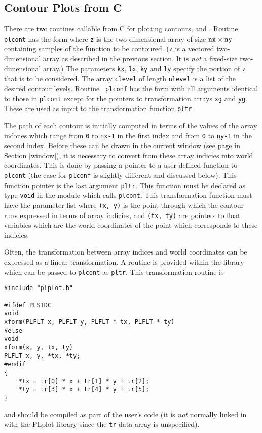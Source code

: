 
\subsection {Contour Plots from C}

There are two routines callable from C for plotting contours, 
and .  Routine {\tt plcont} has the form 
where {\tt z} is the two-dimensional
array of size ${\tt nx}\times{\tt ny}$ containing samples of the function to
be contoured.  ({\tt z} is a vectored two-dimensional array as described in
the previous section.  It is {\em not\/} a fixed-size two-dimensional
array.) The parameters {\tt kx}, {\tt lx}, {\tt ky} and {\tt ly} specify the
portion of {\tt z} that is to be considered.  The array {\tt clevel} of
length {\tt nlevel} is a list of the desired contour levels.  Routine {\tt
plconf} has the form  with all arguments identical to those in {\tt plcont} except
for the pointers to transformation arrays {\tt xg} and {\tt yg}.  These are
used as input to the transformation function {\tt pltr}.

The path of each contour is initially computed in terms of the values of the
array indicies which range from {\tt 0} to {\tt nx-1} in the
first index and from
{\tt 0} to {\tt ny-1} in the second index.
Before these can be drawn in the current
window (see page \pageref{window} in Section \ref{window}), it is
necessary to
convert from these array indicies into world coordinates. This is done by
passing a pointer to a user-defined function to {\tt plcont} (the case for
{\tt plconf} is slightly different and discussed below).  This
function pointer is the last argument {\tt pltr}.
This function must be declared as type {\tt void} in the
module which calls {\tt plcont}. This transformation function
must have the parameter list
where {\tt (x, y)}
is the point through which the contour runs expressed in terms of array
indicies, and {\tt (tx, ty)} are pointers to float variables which are the
world coordinates of the point which corresponds to these indicies.

Often, the transformation between array indices and world coordinates can be
expressed as a linear transformation.  A routine is provided within the
library which can be passed to {\tt plcont} as {\tt pltr}.  This
transformation routine is
\begin{verbatim}
#include "plplot.h"

#ifdef PLSTDC
void 
xform(PLFLT x, PLFLT y, PLFLT * tx, PLFLT * ty)
#else
void 
xform(x, y, tx, ty)
PLFLT x, y, *tx, *ty;
#endif
{
    *tx = tr[0] * x + tr[1] * y + tr[2];
    *ty = tr[3] * x + tr[4] * y + tr[5];
}
\end{verbatim}
and should be compiled as part of the user's code (it is {\em not\/}
normally linked in with the PLplot library since the {\tt tr} data array is
unspecified).

